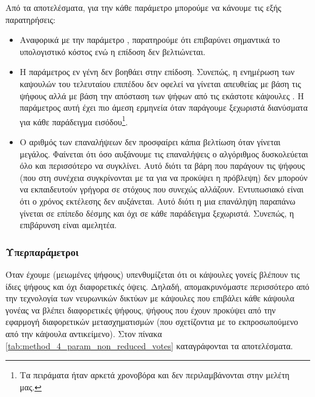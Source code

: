 Από τα αποτελέσματα, για την κάθε παράμετρο μπορούμε να κάνουμε τις εξής παρατηρήσεις:
\begin{itemize}
    \item Αναφορικά με την παράμετρο , παρατηρούμε ότι επιβαρύνει σημαντικά το υπολογιστικό κόστος ενώ η επίδοση δεν βελτιώνεται.
    \item Η παράμετρος  εν γένη δεν βοηθάει στην επίδοση. Συνεπώς, η ενημέρωση των καψουλών του τελευταίου επιπέδου δεν οφελεί να γίνεται απευθείας με βάση τις ψήφους αλλά με βάση την απόσταση των ψήφων από τις εκάστοτε κάψουλες . Η παράμετρος αυτή έχει πιο άμεση ερμηνεία όταν παράγουμε ξεχωριστά διανύσματα  για κάθε παράδειγμα εισόδου\footnote{Τα πειράματα ήταν αρκετά χρονοβόρα και δεν περιλαμβάνονται στην μελέτη μας.}. 
    \item Ο αριθμός των επαναλήψεων δεν προσφαίρει κάπια βελτίωση όταν γίνεται μεγάλος. Φαίνεται ότι όσο αυξάνουμε τις επαναλήψεις ο αλγόριθμος δυσκολεύεται όλο και περισσότερο να συγκλίνει. Αυτό διότι τα βάρη που παράγουν τις ψήφους (που στη συνέχεια συγκρίνονται με τα  για να προκύψει η πρόβλεψη) δεν μπορούν να εκπαιδευτούν γρήγορα σε στόχους που συνεχώς αλλάζουν. Εντυπωσιακό είναι ότι ο χρόνος εκτέλεσης δεν αυξάνεται. Αυτό διότι η μια επανάληψη παραπάνω γίνεται σε επίπεδο δέσμης και όχι σε κάθε παράδειγμα ξεχωριστά. Συνεπώς, η επιβάρυνση είναι αμελητέα. 
\end{itemize}

\subsubsection{Υπερπαράμετροι }
Όταν έχουμε  (μειωμένες ψήφους) υπενθυμίζεται ότι οι κάψουλες γονείς βλέπουν τις ίδιες ψήφους και όχι διαφορετικές όψεις. Δηλαδή, απομακρυνόμαστε περισσότερο από την τεχνολογία των νευρωνικών δικτύων με κάψουλες που επιβάλει κάθε κάψουλα γονέας να βλέπει διαφορετικές ψήφους, ψήφους που έχουν προκύψει από την εφαρμογή διαφορετικών μετασχηματισμών (που σχετίζοντια με το εκπροσωπούμενο από την κάψουλα αντικείμενο). Στον πίνακα \ref{tab:method_4_param_non_reduced_votes} καταγράφονται τα αποτελέσματα.\par

